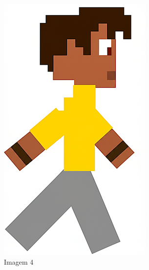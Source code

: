 \begin{figure}[htbp]
\begin{subfigure}{0.23\linewidth}
        \includegraphics[width=1\linewidth]{figs/geminiPro/chat10/tela1_res2_4.PNG}
        \caption{\small Imagem 4}
        \label{fig:geminiProSheet5_2d}
    \end{subfigure}
    \begin{subfigure}{0.23\linewidth}

\end{subfigure}
\end{figure}
